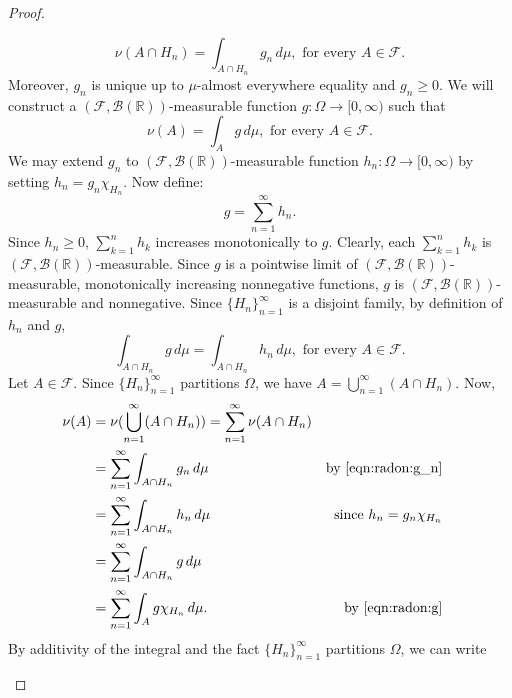 \begin{proof}
\begin{step}
\begin{equation}
\label{eqn:radon:g_n}
    \nu(A \cap H_n) = \int_{A \cap H_n} g_n  \,d\mu, \text{ for every $A \in \mathcal{F}$}.
\end{equation}
Moreover, $g_n$ is unique up to $\mu$-almost everywhere equality and $g_n \geq 0$.
We will construct a $(\mathcal{F}, \mathcal{B}(\mathbb{R}))$-measurable function $g : \Omega \to [0, \infty)$ such that
\begin{equation*}
    \nu(A) = \int_{A} g  \,d\mu, \text{ for every $A \in \mathcal{F}$}.
\end{equation*}
We may extend $g_n$ to $(\mathcal{F}, \mathcal{B}(\mathbb{R}))$-measurable function $h_n : \Omega \to [0, \infty)$ by setting $h_n = g_n \chi_{H_n}$. Now define:
\begin{equation*}
    g = \sum_{n = 1} ^ {\infty} h_n.
\end{equation*}
Since $h_n \geq 0$, $\sum_{k=1}^{n} h_k$ increases monotonically to $g$. Clearly, each $\sum_{k=1}^{n} h_k$ is  $(\mathcal{F}, \mathcal{B}(\mathbb{R}))$-measurable. Since $g$ is a pointwise limit of $(\mathcal{F}, \mathcal{B}(\mathbb{R}))$-measurable, monotonically increasing nonnegative functions, $g$ is $(\mathcal{F}, \mathcal{B}(\mathbb{R}))$-measurable and nonnegative. Since $\{H_n\}_{n=1}^{\infty}$ is a disjoint family, by definition of $h_n$ and $g$, 
\begin{equation}
\label{eqn:radon:g}
    \int_{A \cap H_n} g \,d\mu = \int_{A \cap H_n} h_n  \,d\mu, \text{ for every $A \in \mathcal{F}$}.
\end{equation}
Let  $A \in \mathcal{F}$. Since $\{H_n\}_{n=1}^{\infty}$ partitions $\Omega$, we have $A = \bigcup_{n=1}^{\infty} (A \cap H_n)$.
Now, 
\begin{align*}
    \nu(A) &= \nu(\bigcup_{n=1}^{\infty} (A \cap H_n)) = \sum_{n=1}^{\infty} \nu(A \cap H_n)  & \\
                &= \sum_{n=1}^{\infty} \int_{A \cap H_n} g_n \,d\mu & \text{by \ref{eqn:radon:g_n}} & \\
                &= \sum_{n=1}^{\infty} \int_{A \cap H_n} h_n \,d\mu & \text{since $h_n = g_n \chi_{H_n}$} & \\
                &= \sum_{n=1}^{\infty} \int_{A \cap H_n} g \,d\mu & \\
                &= \sum_{n=1}^{\infty} \int_{A} g \chi_{H_n} \,d\mu. & \text{by \ref{eqn:radon:g}}
\end{align*}
By additivity of the integral and the fact $\{H_n\}_{n=1}^{\infty}$ partitions $\Omega$, we can write

\end{step}
\end{proof}

